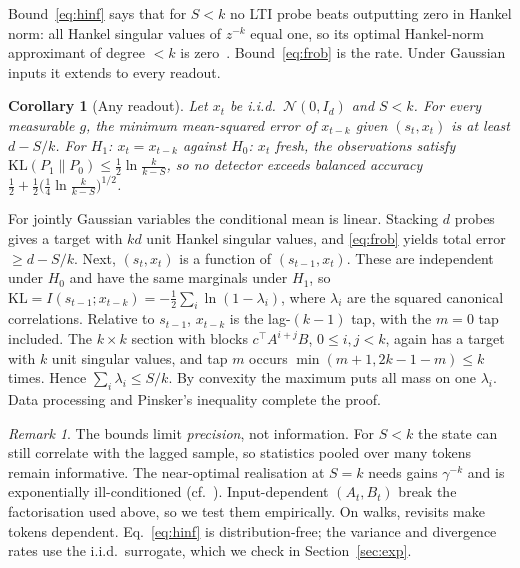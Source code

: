 \documentclass[journal]{IEEEtran}
\newtheorem{corollary}{Corollary}
\theoremstyle{remark}
\newtheorem{remark}{Remark}
\begin{document}
Bound~\eqref{eq:hinf} says that for $S<k$ no LTI probe beats outputting zero
in Hankel norm: all Hankel singular values of $z^{-k}$ equal one, so its
optimal Hankel-norm approximant of degree $<k$ is
zero~\cite{aak1971,glover1984hankel}. Bound~\eqref{eq:frob} is the rate.
Under Gaussian inputs it extends to every readout.

\begin{corollary}[Any readout]\label{cor:gauss}
Let $x_t$ be i.i.d.\ $\mathcal N(0,I_d)$ and $S<k$. For every measurable
$g$, the minimum mean-squared error of $x_{t-k}$ given $(s_t,x_t)$ is at least
$d-S/k$. For $H_1$: $x_t=x_{t-k}$ against $H_0$: $x_t$ fresh, the
observations satisfy $\mathrm{KL}(P_1\|P_0)\le\tfrac12\ln\frac{k}{k-S}$, so no
detector exceeds balanced accuracy
$\tfrac12+\tfrac12\big(\tfrac14\ln\frac{k}{k-S}\big)^{1/2}$.
\end{corollary}
\begin{IEEEproof}
For jointly Gaussian variables the conditional mean is linear. Stacking $d$
probes gives a target with $kd$ unit Hankel singular values, and
\eqref{eq:frob} yields total error $\ge d-S/k$. Next, $(s_t,x_t)$ is a
function of $(s_{t-1},x_t)$. These are independent under $H_0$ and have the
same marginals under $H_1$, so
$\mathrm{KL}=I(s_{t-1};x_{t-k})=-\tfrac12\sum_i\ln(1-\lambda_i)$, where
$\lambda_i$ are the squared canonical correlations. Relative to $s_{t-1}$,
$x_{t-k}$ is the lag-$(k-1)$ tap, with the $m=0$ tap included. The $k\times k$
section with blocks $c^\top A^{i+j}B$, $0\le i,j<k$, again has a target with
$k$ unit singular values, and tap $m$ occurs $\min(m+1,2k-1-m)\le k$ times.
Hence $\sum_i\lambda_i\le S/k$.
By convexity the maximum puts all mass on one $\lambda_i$. Data processing and
Pinsker's inequality complete the proof.
\end{IEEEproof}

\begin{remark}
The bounds limit \emph{precision}, not information. For $S<k$ the state can
still correlate with the lagged sample, so statistics pooled over many
tokens remain informative. The near-optimal realisation at $S=k$ needs gains
$\gamma^{-k}$ and is exponentially ill-conditioned (cf.~\cite{li2021curse}).
Input-dependent $(A_t,B_t)$ break the factorisation used above, so we test
them empirically. On walks, revisits make tokens dependent. Eq.~\eqref{eq:hinf} is distribution-free; the variance and
divergence rates use the i.i.d.\ surrogate, which we check in
Section~\ref{sec:exp}.
\end{remark}
\end{document}
